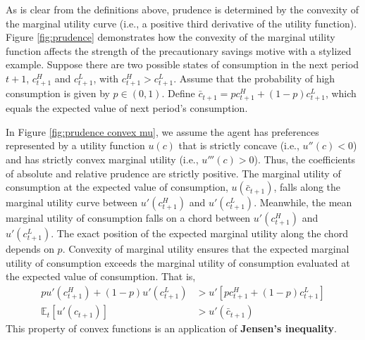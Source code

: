 \documentclass[11pt]{article}
\begin{document}
As is clear from the definitions above, prudence is determined by the convexity of the marginal utility curve (i.e., a positive third derivative of the utility function). Figure \ref{fig:prudence} demonstrates how the convexity of the marginal utility function affects the strength of the precautionary savings motive with a stylized example. Suppose there are two possible states of consumption in the next period $t+1$, $c_{t+1}^H$ and $c_{t+1}^L$, with $c_{t+1}^H > c_{t+1}^L$. Assume that the probability of high consumption is given by $p \in (0,1)$. Define $\bar{c}_{t+1} = p c_{t+1}^H + (1-p)c_{t+1}^L$, which equals the expected value of next period's consumption.

In Figure \ref{fig:prudence convex mu}, we assume the agent has preferences represented by a utility function \(u(c)\) that is strictly concave (i.e., \(u''(c) < 0\)) and has strictly convex marginal utility (i.e., \(u'''(c) > 0\)). Thus, the coefficients of absolute and relative prudence are strictly positive. The marginal utility of consumption at the expected value of consumption, \(u(\bar c_{t+1})\), falls along the marginal utility curve between \(u'(c_{t+1}^H)\) and \(u'(c_{t+1}^L)\). Meanwhile, the mean marginal utility of consumption falls on a chord between \(u'(c_{t+1}^H)\) and \(u'(c_{t+1}^L)\). The exact position of the expected marginal utility along the chord depends on \(p\). Convexity of marginal utility ensures that the expected marginal utility of consumption exceeds the marginal utility of consumption evaluated at the expected value of consumption. That is,
\begin{align}
    p u'(c_{t+1}^H) + (1-p) u'(c_{t+1}^L) &> u'\left[p c_{t+1}^H + (1-p)c_{t+1}^L\right] \nonumber \\
    \mathbb{E}_t\!\left[u'(c_{t+1})\right] &> u'(\bar c_{t+1}) \label{eqn:jensens}
\end{align}
This property of convex functions is an application of \textbf{Jensen's inequality}.
\end{document}
